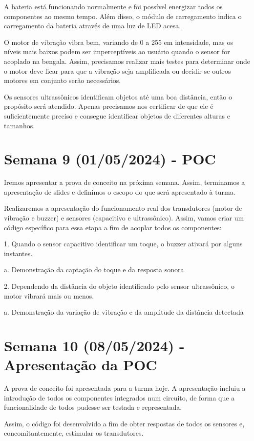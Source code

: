 A bateria está funcionando normalmente e foi possível energizar todos os componentes ao mesmo tempo. Além disso, o módulo de carregamento indica o carregamento da bateria através de uma luz de LED acesa. 

O motor de vibração vibra bem, variando de 0 a 255 em intensidade, mas os níveis mais baixos podem ser imperceptíveis ao usuário quando o sensor for acoplado na bengala. Assim, precisamos realizar mais testes para determinar onde o motor deve ficar para que a vibração seja amplificada ou decidir se outros motores em conjunto serão necessários.

Os sensores ultrassônicos identificam objetos até uma boa distância, então o propósito será atendido. Apenas precisamos nos certificar de que ele é suficientemente preciso e consegue identificar objetos de diferentes alturas e tamanhos.

\section{Semana 9 (01/05/2024) - POC }
Iremos apresentar a prova de conceito na próxima semana. Assim, terminamos a apresentação de slides e definimos o escopo do que será apresentado à turma. 

Realizaremos a apresentação do funcionamento real dos transdutores (motor de vibração e buzzer) e sensores (capacitivo e ultrassônico). Assim, vamos criar um código específico para essa etapa a fim de acoplar todos os componentes:

1. Quando o sensor capacitivo identificar um toque, o buzzer ativará por alguns instantes.

    a. Demonstração da captação do toque e da resposta sonora

2. Dependendo da distância do objeto identificado pelo sensor ultrassônico, o motor vibrará mais ou menos.

    a. Demonstração da variação de vibração e da amplitude da distância detectada
    
\section{Semana 10 (08/05/2024) - Apresentação da POC }
 A prova de conceito foi apresentada para a turma hoje. A apresentação incluiu a introdução de todos os componentes integrados num circuito, de forma que a funcionalidade de todos pudesse ser testada e representada.

Assim, o código foi desenvolvido a fim de obter respostas de todos os sensores e, concomitantemente, estimular os transdutores.



